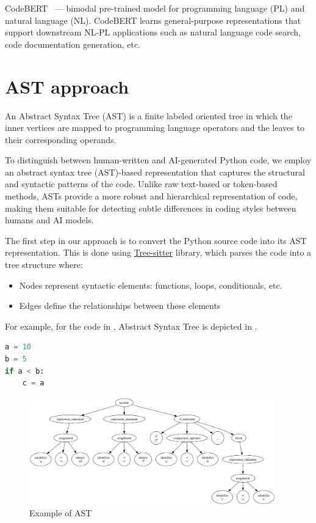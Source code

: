 \documentclass{article}
\begin{document}
CodeBERT~\cite{Feng2020} --- bimodal pre-trained model for programming language (PL) and natural language (NL). CodeBERT learns general-purpose representations that support downstream NL-PL applications such as natural language code search, code documentation generation, etc.

\section{AST approach}
An Abstract Syntax Tree (AST) is a finite labeled oriented tree in which the inner vertices are mapped to programming language operators and the leaves to their corresponding operands.

To distinguish between human-written and AI-generated Python code, we employ an abstract syntax tree (AST)-based representation that captures the structural and syntactic patterns of the code. Unlike raw text-based or token-based methods, ASTs provide a more robust and hierarchical representation of code, making them suitable for detecting subtle differences in coding styles between humans and AI models.

The first step in our approach is to convert the Python source code into its AST representation. This is done using \href{https://tree-sitter.github.io/tree-sitter/}{Tree-sitter} library, which parses the code into a tree structure where:

\begin{itemize}
  \item Nodes represent syntactic elements: functions, loops, conditionals, etc.
  \item Edges define the relationships between these elements
\end{itemize}

For example, for the code in , Abstract Syntax Tree is depicted in .

\begin{lstlisting}[language=Python,frame=single,caption=Python code snippet,label=lst:code_ast]
a = 10
b = 5
if a < b:
    c = a
\end{lstlisting}

\begin{figure}[H]
  \centering
  \includegraphics[width=0.95\textwidth]{./pictures/ast_output.png}
  \caption{Example of AST}\label{fig:ex_ast}
\end{figure}
\end{document}
